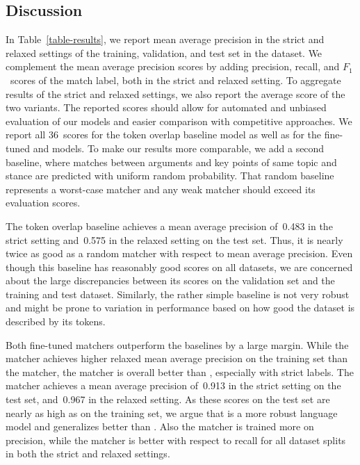\subsection{Discussion}
In Table~\ref{table-results}, we report mean average precision in the strict and relaxed settings of the training, 
validation, and test set in the \ArgKP dataset.
We complement the mean average precision scores by adding precision, recall, and $F_1$~scores of the match label, 
both in the strict and relaxed setting.
To aggregate results of the strict and relaxed settings, we also report the average score of the two variants.
The reported scores should allow for automated and unbiased evaluation of our models and easier comparison with competitive approaches.
We report all 36~scores for the token overlap baseline model as well as for the fine-tuned \BertBase and \RobertaBase models.
To make our results more comparable, we add a second baseline, where matches between arguments and key points of same 
topic and stance are predicted with uniform random probability.
That random baseline represents a worst-case matcher and any weak matcher should exceed its evaluation scores.

The token overlap baseline achieves a mean average precision of~0.483 in the strict setting and~0.575 in the relaxed 
setting on the test set.
Thus, it is nearly twice as good as a random matcher with respect to mean average precision.
Even though this baseline has reasonably good scores on all datasets, we are concerned about the large discrepancies 
between its scores on the validation set and the training and test dataset.
Similarly, the rather simple baseline is not very robust and might be prone to variation in performance based on how 
good the dataset is described by its tokens.

Both fine-tuned matchers outperform the baselines by a large margin.
While the \BertBase matcher achieves higher relaxed mean average precision on the training set than the \RobertaBase 
matcher, the \RobertaBase matcher is overall better than \Bert, especially with strict labels.
The \RobertaBase matcher achieves a mean average precision of~0.913 in the strict setting on the test set, and~0.967 
in the relaxed setting.
As these scores on the test set are nearly as high as on the training set, we argue that \Roberta is a more robust 
language model and generalizes better than \Bert.
Also the \RobertaBase matcher is trained more on precision, while the \BertBase matcher is better with respect to 
recall for all dataset splits in both the strict and relaxed settings.
